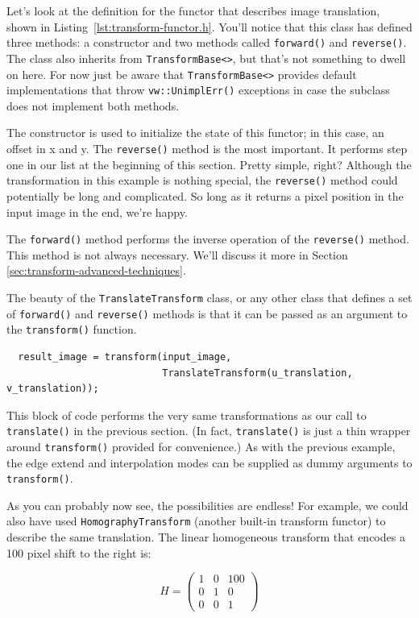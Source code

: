 Let's look at the definition for the functor that describes image
translation, shown in Listing~\ref{lst:transform-functor.h}.  You'll
notice that this class has defined three methods: a constructor and
two methods called \verb#forward()# and \verb#reverse()#.  The class
also inherits from \verb#TransformBase<>#, but that's not something to
dwell on here.  For now just be aware that \verb#TransformBase<>#
provides default implementations that throw \verb#vw::UnimplErr()#
exceptions in case the subclass does not implement both methods.

The constructor is used to initialize the state of this functor; in
this case, an offset in x and y.  The \verb#reverse()# method is the
most important.  It performs step one in our list at the beginning of
this section.  Pretty simple, right?  Although the transformation in
this example is nothing special, the \verb#reverse()# method could
potentially be long and complicated.  So long as it returns a pixel
position in the input image in the end, we're happy.

The \verb#forward()# method performs the inverse operation of the
\verb#reverse()# method.  This method is not always necessary.  We'll
discuss it more in Section \ref{sec:transform-advanced-techniques}.

The beauty of the \verb#TranslateTransform# class, or any other class
that defines a set of \verb#forward()# and \verb#reverse()# methods is
that it can be passed as an argument to the \verb#transform()# function.

\begin{verbatim} 
  result_image = transform(input_image, 
                           TranslateTransform(u_translation, v_translation));
\end{verbatim}

This block of code performs the very same transformations as our call
to \verb#translate()# in the previous section.  (In fact,
\verb#translate()# is just a thin wrapper around \verb#transform()#
provided for convenience.)  As with the previous example, the edge
extend and interpolation modes can be supplied as dummy arguments to
\verb#transform()#.

As you can probably now see, the possibilities are endless!  For
example, we could also have used \verb#HomographyTransform# (another
built-in transform functor) to describe the same translation.  The
linear homogeneous transform that encodes a 100 pixel shift to the
right is:

\begin{equation}
H =
\left(
\begin{array}{ccc}
 1 & 0  & 100  \\
 0 & 1  & 0  \\
 0 & 0  & 1  
\end{array}
\right)
\end{equation}

